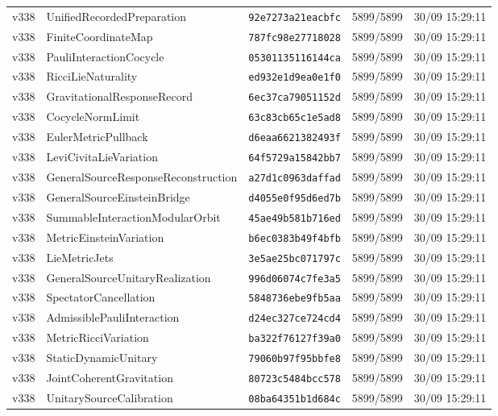 \documentclass[11pt]{article}
\theoremstyle{definition}\newtheorem{deriv}{Derivation}
\begin{document}
{\begin{longtable}{@{}lllll@{}}
v338 & UnifiedRecordedPreparation & \texttt{92e7273a21eacbfc} & 5899/5899 & 30/09 15:29:11 \\
v338 & FiniteCoordinateMap & \texttt{787fc98e27718028} & 5899/5899 & 30/09 15:29:11 \\
v338 & PauliInteractionCocycle & \texttt{05301135116144ca} & 5899/5899 & 30/09 15:29:11 \\
v338 & RicciLieNaturality & \texttt{ed932e1d9ea0e1f0} & 5899/5899 & 30/09 15:29:11 \\
v338 & GravitationalResponseRecord & \texttt{6ec37ca79051152d} & 5899/5899 & 30/09 15:29:11 \\
v338 & CocycleNormLimit & \texttt{63c83cb65c1e5ad8} & 5899/5899 & 30/09 15:29:11 \\
v338 & EulerMetricPullback & \texttt{d6eaa6621382493f} & 5899/5899 & 30/09 15:29:11 \\
v338 & LeviCivitaLieVariation & \texttt{64f5729a15842bb7} & 5899/5899 & 30/09 15:29:11 \\
v338 & GeneralSourceResponseReconstruction & \texttt{a27d1c0963daffad} & 5899/5899 & 30/09 15:29:11 \\
v338 & GeneralSourceEinsteinBridge & \texttt{d4055e0f95d6ed7b} & 5899/5899 & 30/09 15:29:11 \\
v338 & SummableInteractionModularOrbit & \texttt{45ae49b581b716ed} & 5899/5899 & 30/09 15:29:11 \\
v338 & MetricEinsteinVariation & \texttt{b6ec0383b49f4bfb} & 5899/5899 & 30/09 15:29:11 \\
v338 & LieMetricJets & \texttt{3e5ae25bc071797c} & 5899/5899 & 30/09 15:29:11 \\
v338 & GeneralSourceUnitaryRealization & \texttt{996d06074c7fe3a5} & 5899/5899 & 30/09 15:29:11 \\
v338 & SpectatorCancellation & \texttt{5848736ebe9fb5aa} & 5899/5899 & 30/09 15:29:11 \\
v338 & AdmissiblePauliInteraction & \texttt{d24ec327ce724cd4} & 5899/5899 & 30/09 15:29:11 \\
v338 & MetricRicciVariation & \texttt{ba322f76127f39a0} & 5899/5899 & 30/09 15:29:11 \\
v338 & StaticDynamicUnitary & \texttt{79060b97f95bbfe8} & 5899/5899 & 30/09 15:29:11 \\
v338 & JointCoherentGravitation & \texttt{80723c5484bcc578} & 5899/5899 & 30/09 15:29:11 \\
v338 & UnitarySourceCalibration & \texttt{08ba64351b1d684c} & 5899/5899 & 30/09 15:29:11 \\

\end{longtable}}
\end{document}
